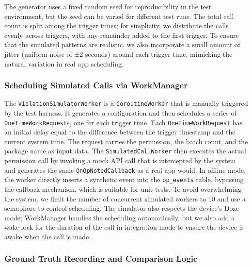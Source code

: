 The generator uses a fixed random seed for reproducibility in the test environment, but the seed can be varied for different test runs. The total call count is split among the trigger times; for simplicity, we distribute the calls evenly across triggers, with any remainder added to the first trigger. To ensure that the simulated patterns are realistic, we also incorporate a small amount of jitter (uniform noise of ±2 seconds) around each trigger time, mimicking the natural variation in real app scheduling.

\subsubsection{Scheduling Simulated Calls via WorkManager}

The \texttt{ViolationSimulatorWorker} is a \texttt{CoroutineWorker} that is manually triggered by the test harness. It generates a configuration and then schedules a series of \texttt{OneTimeWorkRequest}s, one for each trigger time. Each \texttt{OneTimeWorkRequest} has an initial delay equal to the difference between the trigger timestamp and the current system time. The request carries the permission, the batch count, and the package name as input data. The \texttt{SimulatedCallWorker} then executes the actual permission call by invoking a mock API call that is intercepted by the system and generates the same \texttt{OnOpNotedCallback} as a real app would. In offline mode, the worker directly inserts a synthetic event into the \texttt{op\_events} table, bypassing the callback mechanism, which is suitable for unit tests. To avoid overwhelming the system, we limit the number of concurrent simulated workers to 10 and use a semaphore to control scheduling. The simulator also respects the device's Doze mode; WorkManager handles the scheduling automatically, but we also add a wake lock for the duration of the call in integration mode to ensure the device is awake when the call is made.

\subsubsection{Ground Truth Recording and Comparison Logic}

